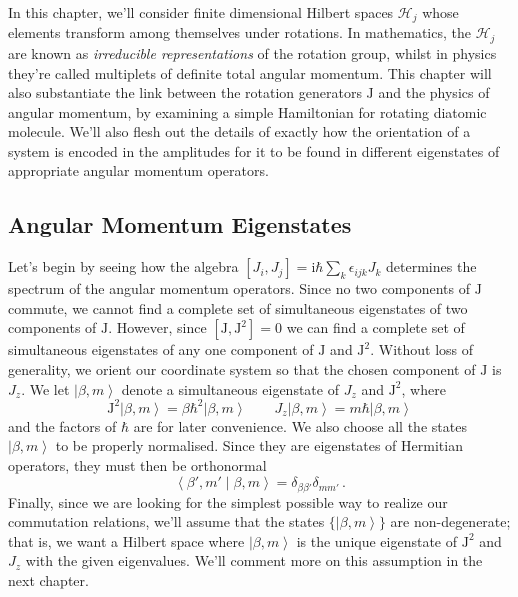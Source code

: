 \documentclass{article}
\theoremstyle{plain}\theoremheaderfont{\normalfont\itshape}\theorembodyfont{\rmfamily}\theoremseparator{.}\newtheorem*{rem}{Remark}\newtheorem*{ex}{Example}\newtheorem*{proof}{Proof}\newtheorem*{altp}{Alternative proof}
\theoremstyle{plain}\theoremheaderfont{\normalfont\bfseries}\theorembodyfont{\rmfamily}\theoremseparator{.}\newtheorem{thm}{Theorem}[section]\newtheorem{lem}[thm]{Lemma}\newtheorem{prop}[thm]{Proposition}\newtheorem*{cor}{Corollary}\newtheorem{defn}[thm]{Definition}\newtheorem{clm}[thm]{Claim}\newtheorem{clminproof}{Claim}
\theoremstyle{break}\theoremheaderfont{\normalfont\itshape}\theorembodyfont{\rmfamily}\theoremseparator{.\medskip}\newtheorem*{proofskip}{Proof}\newtheorem*{exs}{Examples}\newtheorem*{rems}{Remarks}
\theoremstyle{break}\theoremheaderfont{\normalfont\bfseries}\theorembodyfont{\rmfamily}\theoremseparator{.\medskip}\newtheorem{lemskip}[thm]{Lemma}\newtheorem{defnskip}[thm]{Definition}\newtheorem{propskip}[thm]{Proposition}\newtheorem{thmskip}[thm]{Theorem}
\numberwithin{equation}{section}
\newcommand{\ii}{\mathrm{i}}
\newcommand{\ket}[1]{\left| #1 \right\rangle}
\newcommand{\braket}[2]{\left\langle #1 \middle| #2 \right\rangle}
\newcommand{\vb}[1]{\bm{\mathrm{#1}}}
\newcommand{\hb}{\mathcal{H}}
\begin{document}
    In this chapter, we'll consider finite dimensional Hilbert spaces \(\hb_j\) whose elements transform among themselves under rotations. In mathematics, the \(\hb_j\) are known as \textit{irreducible representations} of the rotation group, whilst in physics they're called multiplets of definite total angular momentum. This chapter will also substantiate the link between the rotation generators \(\vb{J}\) and the physics of angular momentum, by examining a simple Hamiltonian for rotating diatomic molecule. We'll also flesh out the details of exactly how the orientation of a system is encoded in the amplitudes for it to be found in different eigenstates of appropriate angular momentum operators.

    \subsection{Angular Momentum Eigenstates}
    Let's begin by seeing how the algebra \([J_i,J_j]=\ii\hbar\sum_k\epsilon_{ijk}J_k\) determines the spectrum of the angular momentum operators. Since no two components of \(\vb{J}\) commute, we cannot find a complete set of simultaneous eigenstates of two components of \(\vb{J}\). However, since \([\vb{J},\vb{J}^2]=0\) we can find a complete set of simultaneous eigenstates of any one component of \(\vb{J}\) and \(\vb{J}^2\). Without loss of generality, we orient our coordinate system so that the chosen component of \(\vb{J}\) is \(J_z\). We let \(\ket{\beta,m}\) denote a simultaneous eigenstate of \(J_z\) and \(\vb{J}^2\), where
    \begin{equation}
        \vb{J}^2\ket{\beta,m}=\beta\hbar^2\ket{\beta,m}\qquad J_z\ket{\beta,m}=m\hbar\ket{\beta,m}
    \end{equation}
    and the factors of \(\hbar\) are for later convenience. We also choose all the states \(\ket{\beta,m}\) to be properly normalised. Since they are eigenstates of Hermitian operators, they must then be orthonormal
    \begin{equation}
        \braket{\beta',m'}{\beta,m}=\delta_{\beta\beta'}\delta_{mm'}\,.
    \end{equation}
    Finally, since we are looking for the simplest possible way to realize our commutation relations, we'll assume that the states \(\{\ket{\beta,m}\}\) are non-degenerate; that is, we want a Hilbert space where \(\ket{\beta,m}\) is the unique eigenstate of \(\vb{J}^2\) and \(J_z\) with the given eigenvalues. We'll comment more on this assumption in the next chapter.
\end{document}
